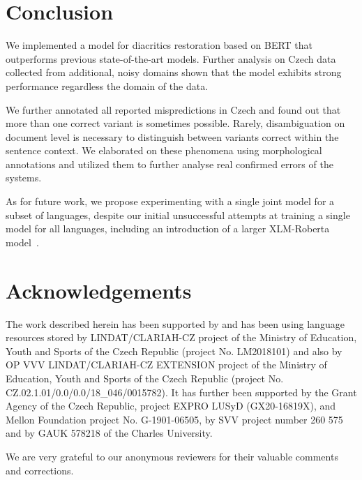 \documentclass{pbmlarxiv}
\begin{document}
\section{Conclusion}

We implemented a model for diacritics restoration based on BERT that outperforms previous state-of-the-art models. Further analysis on Czech data collected from additional, noisy domains shown that the model exhibits strong performance regardless the domain of the data. 

We further annotated all reported mispredictions in Czech and found out that more than one correct variant is sometimes possible. Rarely, disambiguation on document level is necessary to distinguish between variants correct within the sentence context. We elaborated on these phenomena using morphological annotations and utilized them to further analyse real confirmed errors of the systems. 

As for future work, we propose experimenting with a single joint model for a subset of languages, despite our initial unsuccessful attempts at training a single model for all languages, including an introduction of a larger XLM-Roberta model~\cite{conneau2020unsupervised}.

\section*{Acknowledgements}

The work described herein has been supported by and has been using language resources  stored by LINDAT/CLARIAH-CZ project of the Ministry of Education, Youth and Sports of the Czech Republic (project No. LM2018101) and also by OP VVV LINDAT/CLARIAH-CZ EXTENSION project of the Ministry of Education, Youth and Sports of the Czech Republic (project No. \hbox{CZ.02.1.01/0.0/0.0/18\_046/0015782}). It has further been supported by the Grant Agency of the Czech Republic, project \hbox{EXPRO} LUSyD (GX20-16819X), and Mellon Foundation project No. G-1901-06505, by SVV project number 260 575 and by GAUK 578218 of the Charles University.

We are very grateful to our anonymous reviewers for their valuable comments and corrections.





\correspondingaddress
\end{document}
